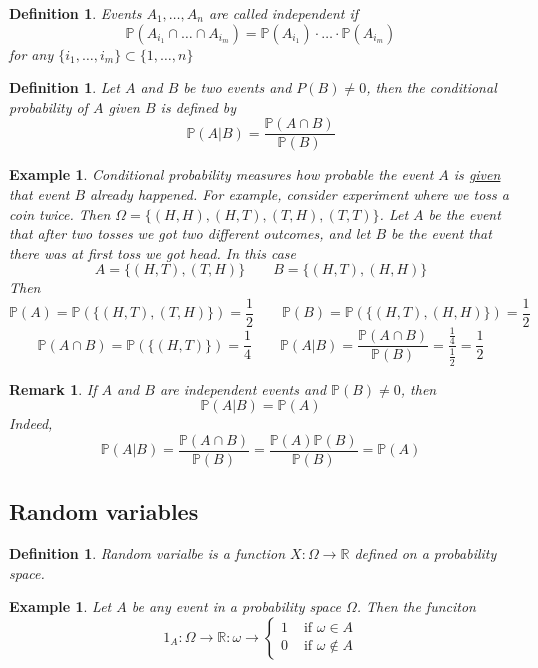 \documentclass[12pt]{article}
\newtheorem{remark}[theorem]{Remark}
\newtheorem{definition}[theorem]{Definition}
\newtheorem{example}[theorem]{Example}
\begin{document}
\begin{definition} Events $A_1,\ldots,A_n$ are called independent if
$$
\mathbb{P}(A_{i_1}\cap\ldots\cap A_{i_m})=\mathbb{P}(A_{i_1})\cdot\ldots\cdot\mathbb{P}(A_{i_m})
$$
for any $\{i_1,\ldots,i_m\}\subset\{1,\ldots,n\}$
\end{definition}

\begin{definition} Let $A$ and $B$ be two events and $P(B)\neq 0$, then the conditional probability of $A$ given $B$ is defined by
$$
\mathbb{P}(A|B)=\frac{\mathbb{P}(A\cap B)}{\mathbb{P}(B)}
$$
\end{definition}

\begin{example} Conditional probability measures how probable the event $A$ is \underline{given} that event $B$ already happened. For example, consider experiment where we toss a coin twice. Then $\Omega=\{(H, H), (H, T), (T,H), (T,T)\}$. Let $A$ be the event that after two tosses we got two different outcomes, and let $B$ be the event that there was at first toss we got head. In this case 
$$
A=\{(H,T),(T,H)\}\quad\quad B=\{(H,T),(H,H)\}
$$
Then
$$
\mathbb{P}(A)=\mathbb{P}(\{(H,T),(T,H)\})=\frac{1}{2}\quad\quad \mathbb{P}(B)=\mathbb{P}(\{(H,T),(H,H)\})=\frac{1}{2}
$$
$$
\mathbb{P}(A\cap B)=\mathbb{P}(\{(H,T)\})=\frac{1}{4}\quad\quad \mathbb{P}(A|B)=\frac{\mathbb{P}(A\cap B)}{\mathbb{P}(B)}=\frac{\frac{1}{4}}{\frac{1}{2}}=\frac{1}{2}
$$
\end{example}

\begin{remark} If $A$ and $B$ are independent events and $\mathbb{P}(B)\neq 0$, then
$$
\mathbb{P}(A|B)=\mathbb{P}(A)
$$
Indeed,
$$
\mathbb{P}(A|B)=\frac{\mathbb{P}(A\cap B)}{\mathbb{P}(B)}=\frac{\mathbb{P}(A)\mathbb{P}(B)}{\mathbb{P}(B)}=\mathbb{P}(A)
$$
\end{remark}


\subsection{Random variables}

\begin{definition} Random varialbe is a function $X:\Omega\to \mathbb{R}$ defined on a probability space.
\end{definition}

\begin{example} Let $A$ be any event in a probability space $\Omega$. Then the funciton
$$
1_A:\Omega\to\mathbb{R}:\omega\to
\begin{cases} 
1 & \mbox{ if }\omega\in A\\
0 & \mbox{ if }\omega\notin A
\end{cases}
$$
\end{example}
\end{document}
